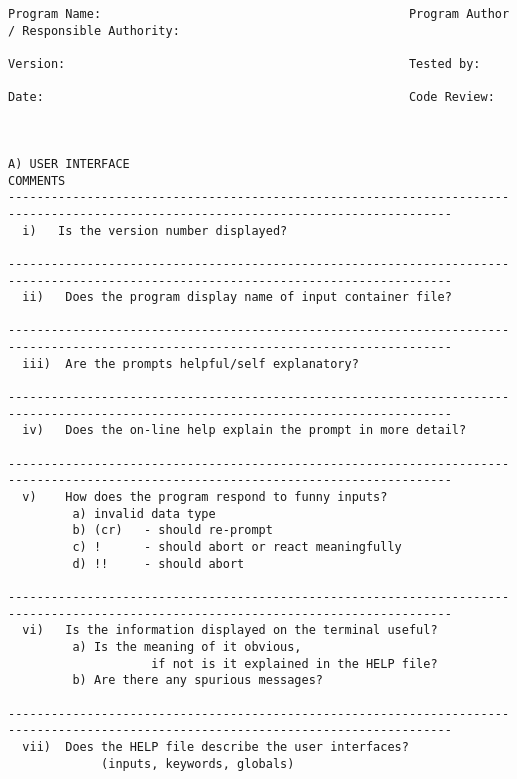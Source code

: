 \begin{tiny}
\begin{verbatim}
Program Name:                                           Program Author / Responsible Authority:  

Version:                                                Tested by:                   

Date:                                                   Code Review:



A) USER INTERFACE                                                                               COMMENTS
------------------------------------------------------------------------------------------------------------------------------------
  i)   Is the version number displayed?

------------------------------------------------------------------------------------------------------------------------------------
  ii)   Does the program display name of input container file? 

------------------------------------------------------------------------------------------------------------------------------------
  iii)  Are the prompts helpful/self explanatory?       

------------------------------------------------------------------------------------------------------------------------------------
  iv)   Does the on-line help explain the prompt in more detail?                              

------------------------------------------------------------------------------------------------------------------------------------
  v)    How does the program respond to funny inputs?   
         a) invalid data type                         
         b) (cr)   - should re-prompt                  
         c) !      - should abort or react meaningfully      
         d) !!     - should abort                   

------------------------------------------------------------------------------------------------------------------------------------
  vi)   Is the information displayed on the terminal useful?
         a) Is the meaning of it obvious,             
                    if not is it explained in the HELP file?
         b) Are there any spurious messages?              

------------------------------------------------------------------------------------------------------------------------------------
  vii)  Does the HELP file describe the user interfaces?
             (inputs, keywords, globals)            


\end{verbatim}
\end{tiny}
